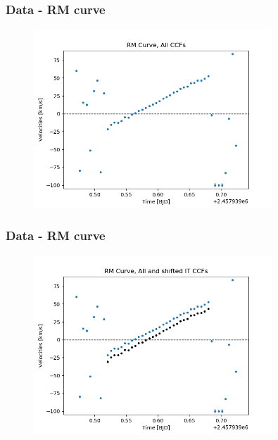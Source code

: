 \documentclass[show notes]{beamer}
\begin{document}
\begin{frame}
\frametitle{Data - RM curve}
	\begin{figure}
		\centering
		\includegraphics[width=0.8\textwidth]{../figures/RM_all_CCFs.png}
		\label{fig:RM_all_CCFs}
	\end{figure}
\end{frame}


\begin{frame}
\frametitle{Data - RM curve}
\begin{figure}
	\centering
	\includegraphics[width=0.8\textwidth]{../figures/RM_all_shift.png}
	\label{fig:RM_all_shift}
\end{figure}
\end{frame}
\end{document}
